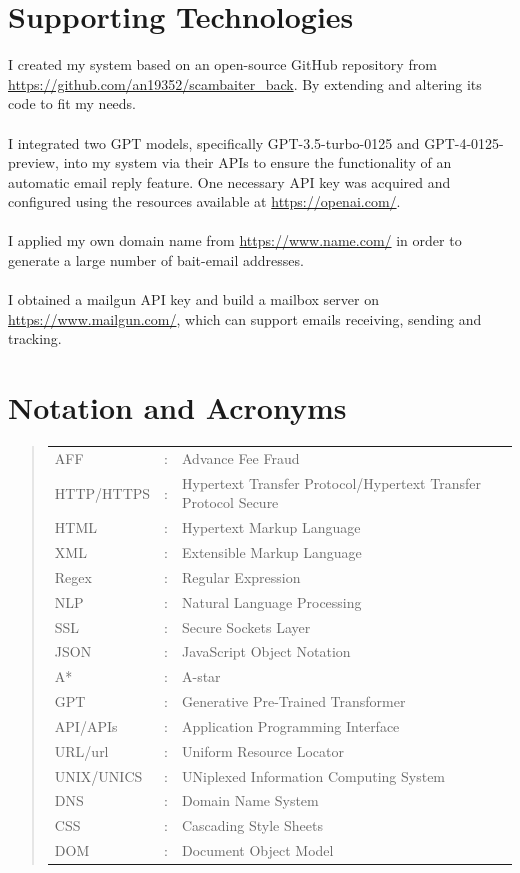 \documentclass[ oneside,%
                    author={Cassie Qing Tang},
                    degree={BSc},
                     title={An Automated Response System for Disrupting Online Pet Scamming \\ },
                    subtitle={ }]{dissertation}
\begin{document}
\chapter*{Supporting Technologies}
I created my system based on an open-source GitHub repository from \url{https://github.com/an19352/scambaiter_back}. By extending and altering its code to fit my needs.
\\
\\
I integrated two GPT models, specifically GPT-3.5-turbo-0125 and GPT-4-0125-preview, into my system via their APIs to ensure the functionality of an automatic email reply feature. One necessary API key was acquired and configured using the resources available at \url{https://openai.com/}.
\\
\\
I applied my own domain name from \url{https://www.name.com/} in order to generate a large number of bait-email addresses.
\\
\\
I obtained a mailgun API key and build a mailbox server on \url{https://www.mailgun.com/}, which can support emails receiving, sending and tracking.

\chapter*{Notation and Acronyms}
\begin{quote}
\noindent
\begin{tabular}{lcl}
AFF                 &:     & Advance Fee Fraud    
 \\ 
HTTP/HTTPS          &:     & Hypertext Transfer Protocol/Hypertext Transfer Protocol Secure
 \\ 
HTML                &:     & Hypertext Markup Language
\\
XML                 &:     & Extensible Markup Language
\\
Regex               &:     & Regular Expression
\\
NLP                 &:     & Natural Language Processing
\\
SSL                 &:     & Secure Sockets Layer
\\
JSON                &:     & JavaScript Object Notation
\\
A*                  &:     & A-star
\\
GPT                 &:     & Generative Pre-Trained Transformer
\\
API/APIs            &:     & Application Programming Interface
\\
URL/url             &:     & Uniform Resource Locator
\\
UNIX/UNICS          &:     & UNiplexed Information Computing System
\\
DNS                 &:     & Domain Name System
\\
CSS                 &:     & Cascading Style Sheets
\\
DOM                 &:     & Document Object Model


\end{tabular}
\end{quote}
\end{document}

